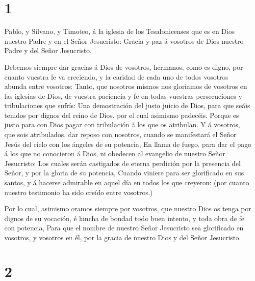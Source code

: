 \hypertarget{section}{%
\section{1}\label{section}}

 Pablo, y Silvano, y Timoteo, á la iglesia de los
Tesalonicenses que es en Dios nuestro Padre y en el Señor Jesucristo:
 Gracia y paz á vosotros de Dios nuestro Padre y del Señor
Jesucristo.

 Debemos siempre dar gracias á Dios de vosotros, hermanos,
como es digno, por cuanto vuestra fe va creciendo, y la caridad de cada
uno de todos vosotros abunda entre vosotros;  Tanto, que
nosotros mismos nos gloriamos de vosotros en las iglesias de Dios, de
vuestra paciencia y fe en todas vuestras persecuciones y tribulaciones
que sufrís:  Una demostración del justo juicio de Dios, para
que seáis tenidos por dignos del reino de Dios, por el cual asimismo
padecéis.  Porque es justo para con Dios pagar con
tribulación á los que os atribulan.  Y á vosotros, que sois
atribulados, dar reposo con nosotros, cuando se manifestará el Señor
Jesús del cielo con los ángeles de su potencia,  En llama de
fuego, para dar el pago á los que no conocieron á Dios, ni obedecen al
evangelio de nuestro Señor Jesucristo;  Los cuales serán
castigados de eterna perdición por la presencia del Señor, y por la
gloria de su potencia,  Cuando viniere para ser glorificado
en sus santos, y á hacerse admirable en aquel día en todos los que
creyeron: (por cuanto nuestro testimonio ha sido creído entre vosotros.)

 Por lo cual, asimismo oramos siempre por vosotros, que
nuestro Dios os tenga por dignos de su vocación, é hincha de bondad todo
buen intento, y toda obra de fe con potencia,  Para que el
nombre de nuestro Señor Jesucristo sea glorificado en vosotros, y
vosotros en él, por la gracia de nuestro Dios y del Señor Jesucristo.

\hypertarget{section-1}{%
\section{2}\label{section-1}}

